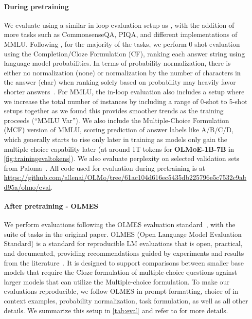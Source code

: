 \documentclass{article}
\newcommand{\modelsmall}{\textbf{\textsc{OLMoE-1B-7B}}}
\begin{document}
\paragraph{During pretraining} We evaluate using a similar in-loop evaluation setup as \citet{groeneveld2024olmo}, with the addition of more tasks such as CommonsenseQA, PIQA, and different implementations of MMLU. Following \citet{groeneveld2024olmo}, for the majority of the tasks, we perform 0-shot evaluation using the Completion/Cloze Formulation (CF), ranking each answer string using language model probabilities. In terms of probability normalization, there is either no normalization (none) or normalization by the number of characters in the answer (char) when ranking solely based on probability may heavily favor shorter answers~\citep{brown2020language}. For MMLU, the in-loop evaluation also includes a setup where we increase the total number of instances by including a range of 0-shot to 5-shot setups together as we found this provides smoother trends as the training proceeds (``MMLU Var''). We also include the Multiple-Choice Formulation (MCF) version of MMLU, scoring prediction of answer labels like A/B/C/D, which generally starts to rise only later in training as models only gain the multiple-choice capability later (at around 1T tokens for \modelsmall{} in \autoref{fig:trainingevaltokens}). We also evaluate perplexity on selected validation sets from Paloma~\citep{magnusson2023palomabenchmarkevaluatinglanguage,reid2022m2d2massivelymultidomainlanguage,gao2020pile800gbdatasetdiverse,soldaini2024dolma,liang2023holisticevaluationlanguagemodels,merity2016pointersentinelmixturemodels}. All code used for evaluation during pretraining is at \url{https://github.com/allenai/OLMo/tree/61ac104d616ec5435db225796e5c7532c9abd95a/olmo/eval}.

\paragraph{After pretraining - OLMES} We perform evaluations following the OLMES evaluation standard~\citep{gu2024olmesstandardlanguagemodel}, with the suite of tasks in the original paper. OLMES (Open Language Model Evaluation Standard) is a standard for reproducible LM evaluations that is open, practical, and documented, providing recommendations guided by experiments and results from the literature~\citep{biderman2024lessons,eval-harness,groeneveld2023catwalkunifiedlanguagemodel}. It is designed to support comparisons between smaller base models that require the Cloze formulation of multiple-choice questions against larger models that can utilize the Multiple-choice formulation. To make our evaluations reproducible, we follow OLMES in prompt formatting, choice of in-context examples, probability normalization, task formulation, as well as all other details. We summarize this setup in \autoref{tab:eval} and refer to \citet{gu2024olmesstandardlanguagemodel} for more details.
\end{document}
